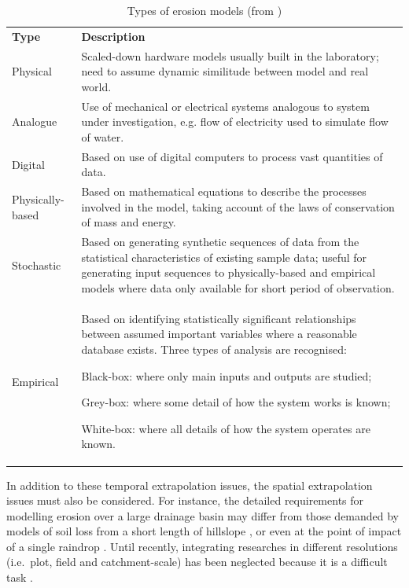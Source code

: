 \begin{table}
  \centering
  \caption[Types of erosion models]{Types of erosion models
(from \citealp{morgan1995-soil})}
  \label{tab:TypesOfModels}
    \small
    \begin{tabular}{lp{150.0mm}}
    \toprule
    \textbf{Type} & \textbf{Description}\\
    Physical & Scaled-down hardware models usually built in the
laboratory; need to assume dynamic similitude between model and real world.\\
    \midrule
    Analogue & Use of mechanical or electrical systems analogous to
system under investigation, e.g. flow of electricity used to simulate flow of
water.\\
    \midrule
    Digital & Based on use of digital computers to process vast
quantities of data.\\
    \midrule
    Physically-based & Based on mathematical equations to describe
the processes involved in the model, taking account of the laws of conservation
of mass and energy.\\
    \midrule
    Stochastic & Based on generating synthetic sequences of data
from the statistical characteristics of existing sample data; useful for
generating input sequences to physically-based and empirical models where data
only available for short period of observation.\\
    \midrule
    Empirical & Based on identifying statistically significant
relationships between assumed important variables where a reasonable database
exists. Three types of analysis are recognised:
    \begin{compactitem}[-]
      \item Black-box: where only main inputs and outputs
are studied;
      \item Grey-box: where some detail of how the system
works is known;
      \item White-box: where all details of how the system
operates are known.
    \end{compactitem}\\
    \bottomrule
    \end{tabular}
\end{table}

In addition to these temporal extrapolation issues, the spatial extrapolation
issues must also be considered. For instance, the detailed requirements for
modelling erosion over a large drainage basin \citep{hooke2000-1778} may differ
from those demanded by models of soil loss from a short length of hillslope
\citep{goff1993-698}, or even at the point of impact of a single raindrop
\citep{sharma1991-301}. Until recently, integrating researches in different
resolutions (i.e.\ plot, field and catchment-scale) has been neglected because it is
a difficult task \citep{boardman1996-489}.

